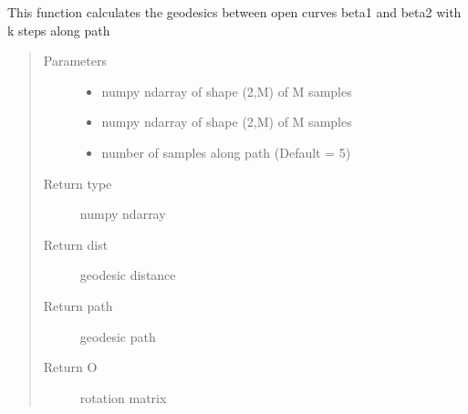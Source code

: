 \documentclass[letterpaper,10pt,english]{sphinxmanual}
\begin{document}
\begin{fulllineitems}
\label{\detokenize{geodesic:geodesic.geod_sphere}}
This function calculates the geodesics between open curves beta1 and
beta2 with k steps along path
\begin{quote}\begin{description}
\item[{Parameters}] \leavevmode\begin{itemize}
\item {} 
 \textendash{} numpy ndarray of shape (2,M) of M samples

\item {} 
 \textendash{} numpy ndarray of shape (2,M) of M samples

\item {} 
 \textendash{} number of samples along path (Default = 5)

\end{itemize}

\item[{Return type}] \leavevmode
numpy ndarray

\item[{Return dist}] \leavevmode
geodesic distance

\item[{Return path}] \leavevmode
geodesic path

\item[{Return O}] \leavevmode
rotation matrix

\end{description}\end{quote}

\end{fulllineitems}

\end{document}
